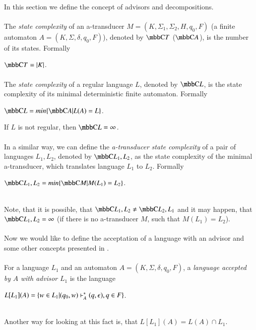 \paragraph{}
In this section we define the concept of advisors and decompositions.

\paragraph{}
 The \emph{state complexity} of an a-transducer $M = (K, \Sigma_1, \Sigma_2, H, q_0, F)$ (a finite automaton $A = (K, \Sigma, \delta, q_0, F)$), denoted by $\C{T}$ ($\C{A}$), is the number of its states. Formally \\
\centerline{$\C{T} = |K|$.}

\paragraph{}
 The \emph{state complexity} of a regular language $L$, denoted by $\C{L}$, is the state complexity of its minimal deterministic finite automaton. Formally \\
\centerline{$\C{L} = min\{ \C{A}|L(A) = L\} $.}

If $L$ is not regular, then $\C{L} = \infty $.

\paragraph{}
 In a similar way, we can define the \emph{a-transducer state complexity} of a pair of languages $L_1, L_2$, denoted by $\C{L_1,L_2}$, as the state complexity of the minimal a-transducer, which translates language $L_1$ to $L_2$. Formally \\
\centerline{$\C{L_1, L_2} = min\{ \C{M}|M(L_1) = L_2\} $.} \\
Note, that it is possible, that $\C{L_1,L_2} \neq \C{L_2,L_1}$ and it may happen, that $\C{L_1,L_2} \allowbreak  = \infty$ (if there is no a-transducer $M$, such that $M(L_1) = L_2$).

\paragraph{}
Now we would like to define the acceptation of a language with an advisor and some other concepts presented in \cite{Gazi}.

\paragraph{}
 For a language $L_1$ and an automaton $A = (K, \Sigma, \delta, q_0, F)$, a \emph{language accepted by $A$ with advisor $L_1$} is the language \\
\centerline{$L[L_1](A) =  \{ w \in L_1 | (q_0, w) \vdash^\ast_A (q, \epsilon), q \in F \}$.}\\
Another way for looking at this fact is, that $L[L_1](A) = L(A) \cap L_1$.
 
